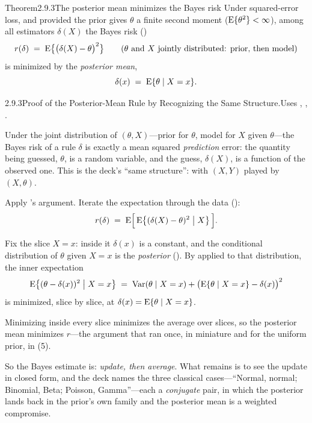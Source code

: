 \documentclass[main.tex]{subfiles}
\begin{document}
\begin{Obj}{Theorem}{2.9.3}{The posterior mean minimizes the Bayes risk}
Under squared-error loss, and provided the prior gives $\theta$ a finite second moment
($\mathrm{E}\{\theta^2\}<\infty$), among all estimators $\delta(X)$ the Bayes risk ()
\[ r(\delta) \;=\; \mathrm{E}\big\{ \big(\delta(X)-\theta\big)^2 \big\}
   \qquad\text{($\theta$ and $X$ jointly distributed: prior, then model)} \]
is minimized by the \emph{posterior mean},
\[ \delta(x) \;=\; \mathrm{E}\{\theta\mid X=x\} . \]
\end{Obj}
\begin{Prf}{2.9.3}{Proof of the Posterior-Mean Rule by Recognizing the Same Structure.}{Uses , , .}
\item Under the joint distribution of $(\theta,X)$---prior for $\theta$, model for $X$ given
      $\theta$---the Bayes risk of a rule $\delta$ is exactly a mean squared
      \emph{prediction} error: the quantity being guessed, $\theta$, is a random variable,
      and the guess, $\delta(X)$, is a function of the observed one. This is the deck's
      ``same structure'':  with $(X,Y)$ played by $(X,\theta)$.
\item Apply 's argument. Iterate the expectation through the data
      ():
      \[ r(\delta) \;=\; \mathrm{E}\Big[\, \mathrm{E}\big\{ (\delta(X)-\theta)^2 \bigm| X \big\} \,\Big] . \]
\item Fix the slice $X=x$: inside it $\delta(x)$ is a constant, and the conditional
      distribution of $\theta$ given $X=x$ is the \emph{posterior} (). By
       applied to that distribution, the inner expectation
      \[ \mathrm{E}\big\{ (\theta-\delta(x))^2 \bigm| X=x \big\}
         \;=\; \operatorname{Var}(\theta\mid X=x) + \big(\mathrm{E}\{\theta\mid X=x\}-\delta(x)\big)^2 \]
      is minimized, slice by slice, at $\delta(x)=\mathrm{E}\{\theta\mid X=x\}$.
\item Minimizing inside every slice minimizes the average over slices, so the posterior mean
      minimizes $r$---the argument that ran once, in miniature and for the uniform prior, in
      (5).
\end{Prf}

\medskip
So the Bayes estimate is: \emph{update, then average}. What remains is to see the update in
closed form, and the deck names the three classical cases---``Normal, normal; Binomial,
Beta; Poisson, Gamma''---each a \emph{conjugate} pair, in which the posterior lands back in
the prior's own family and the posterior mean is a weighted compromise.
\end{document}
